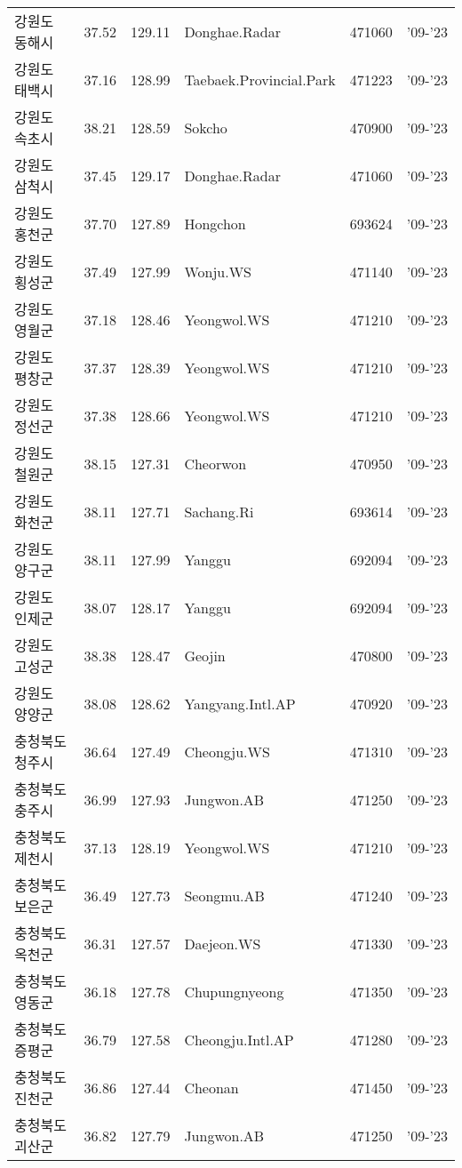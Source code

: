 \begin{longtable}{lcclcc}
  강원도 동해시 & 37.52 & 129.11 & Donghae.Radar & 471060 & '09-'23 \\
  강원도 태백시 & 37.16 & 128.99 & Taebaek.Provincial.Park & 471223 & '09-'23 \\
  강원도 속초시 & 38.21 & 128.59 & Sokcho & 470900 & '09-'23 \\
  강원도 삼척시 & 37.45 & 129.17 & Donghae.Radar & 471060 & '09-'23 \\
  강원도 홍천군 & 37.70 & 127.89 & Hongchon & 693624 & '09-'23 \\
  강원도 횡성군 & 37.49 & 127.99 & Wonju.WS & 471140 & '09-'23 \\
  강원도 영월군 & 37.18 & 128.46 & Yeongwol.WS & 471210 & '09-'23 \\
  강원도 평창군 & 37.37 & 128.39 & Yeongwol.WS & 471210 & '09-'23 \\
  강원도 정선군 & 37.38 & 128.66 & Yeongwol.WS & 471210 & '09-'23 \\
  강원도 철원군 & 38.15 & 127.31 & Cheorwon & 470950 & '09-'23 \\
  강원도 화천군 & 38.11 & 127.71 & Sachang.Ri & 693614 & '09-'23 \\
  강원도 양구군 & 38.11 & 127.99 & Yanggu & 692094 & '09-'23 \\
  강원도 인제군 & 38.07 & 128.17 & Yanggu & 692094 & '09-'23 \\
  강원도 고성군 & 38.38 & 128.47 & Geojin & 470800 & '09-'23 \\
  강원도 양양군 & 38.08 & 128.62 & Yangyang.Intl.AP & 470920 & '09-'23 \\
  충청북도 청주시 & 36.64 & 127.49 & Cheongju.WS & 471310 & '09-'23 \\
  충청북도 충주시 & 36.99 & 127.93 & Jungwon.AB & 471250 & '09-'23 \\
  충청북도 제천시 & 37.13 & 128.19 & Yeongwol.WS & 471210 & '09-'23 \\
  충청북도 보은군 & 36.49 & 127.73 & Seongmu.AB & 471240 & '09-'23 \\
  충청북도 옥천군 & 36.31 & 127.57 & Daejeon.WS & 471330 & '09-'23 \\
  충청북도 영동군 & 36.18 & 127.78 & Chupungnyeong & 471350 & '09-'23 \\
  충청북도 증평군 & 36.79 & 127.58 & Cheongju.Intl.AP & 471280 & '09-'23 \\
  충청북도 진천군 & 36.86 & 127.44 & Cheonan & 471450 & '09-'23 \\
  충청북도 괴산군 & 36.82 & 127.79 & Jungwon.AB & 471250 & '09-'23 \\

\end{longtable}
